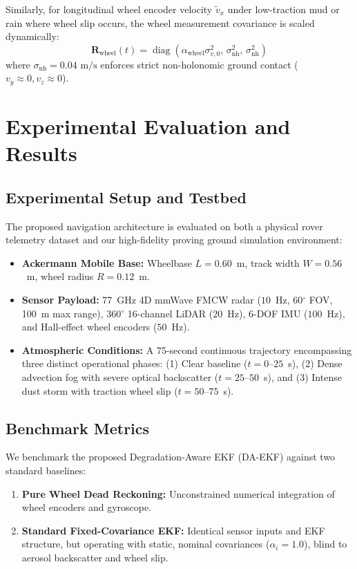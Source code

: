 \documentclass[lettersize,journal]{IEEEtran}
\begin{document}
Similarly, for longitudinal wheel encoder velocity $\tilde{v}_x$ under low-traction mud or rain where wheel slip occurs, the wheel measurement covariance is scaled dynamically:
\begin{equation}
\mathbf{R}_{\mathrm{wheel}}(t) = \operatorname{diag}\left( \alpha_{\mathrm{wheel}} \sigma_{v, 0}^2, \, \sigma_{\mathrm{nh}}^2, \, \sigma_{\mathrm{nh}}^2 \right)
\end{equation}
where $\sigma_{\mathrm{nh}} = 0.04\text{ m/s}$ enforces strict non-holonomic ground contact ($v_y \approx 0, v_z \approx 0$).

\section{Experimental Evaluation and Results}

\subsection{Experimental Setup and Testbed}
The proposed navigation architecture is evaluated on both a physical rover telemetry dataset and our high-fidelity proving ground simulation environment:
\begin{itemize}
    \item \textbf{Ackermann Mobile Base:} Wheelbase $L = 0.60$~m, track width $W = 0.56$~m, wheel radius $R = 0.12$~m.
    \item \textbf{Sensor Payload:} 77~GHz 4D mmWave FMCW radar ($10$~Hz, 60$^\circ$ FOV, 100~m max range), 360$^\circ$ 16-channel LiDAR ($20$~Hz), 6-DOF IMU ($100$~Hz), and Hall-effect wheel encoders ($50$~Hz).
    \item \textbf{Atmospheric Conditions:} A 75-second continuous trajectory encompassing three distinct operational phases: (1) Clear baseline ($t = 0\text{--}25$~s), (2) Dense advection fog with severe optical backscatter ($t = 25\text{--}50$~s), and (3) Intense dust storm with traction wheel slip ($t = 50\text{--}75$~s).
\end{itemize}

\subsection{Benchmark Metrics}
We benchmark the proposed Degradation-Aware EKF (DA-EKF) against two standard baselines:
\begin{enumerate}
    \item \textbf{Pure Wheel Dead Reckoning:} Unconstrained numerical integration of wheel encoders and gyroscope.
    \item \textbf{Standard Fixed-Covariance EKF:} Identical sensor inputs and EKF structure, but operating with static, nominal covariances ($\alpha_i = 1.0$), blind to aerosol backscatter and wheel slip.
\end{enumerate}
\end{document}
